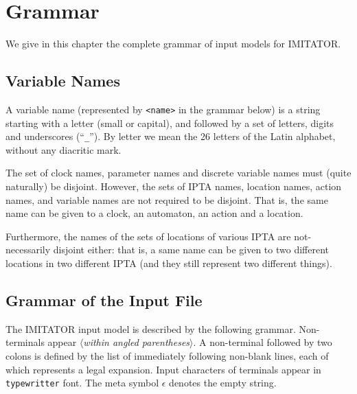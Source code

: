 \documentclass[a4paper,11pt]{report}
\newcommand{\emptystring}{$\epsilon$}
\newcommand{\imitator}{\textsf{IMITATOR}}
\newcommand{\IPTA}{IPTA}
\newcommand{\nt}[1]{$\langle$\emph{#1}$\rangle$}
\newcommand{\styleIMI}[1]{\textcolor{imicolor}{\texttt{#1}}}
\begin{document}
\chapter{Grammar}\label{chapter:grammar}


We give in this chapter the complete grammar of input models for \imitator{}.

\section{Variable Names}

A variable name (represented by \styleIMI{<name>} in the grammar below) is a string starting with a letter (small or capital), and followed by a set of letters, digits and underscores (``\styleIMI{\_}'').
By letter we mean the 26 letters of the Latin alphabet, without any diacritic mark.

The set of clock names, parameter names and discrete variable names must (quite naturally) be disjoint.
However, the sets of \IPTA{} names, location names, action names, and variable names are not required to be disjoint.
That is, the same name can be given to a clock, an automaton, an action and a location.

Furthermore, the names of the sets of locations of various \IPTA{} are not-necessarily disjoint either: that is, a same name can be given to two different locations in two different \IPTA{} (and they still represent two different things).


\section{Grammar of the Input File}

The \imitator{} input model is described by the following grammar.
Non-terminals appear \nt{within angled parentheses}.
A non-terminal followed by two colons is defined by the list of immediately following non-blank lines, each of which represents a legal expansion.
Input characters of terminals appear in \styleIMI{typewritter} font.
The meta symbol \emptystring{} denotes the empty string.
\end{document}
